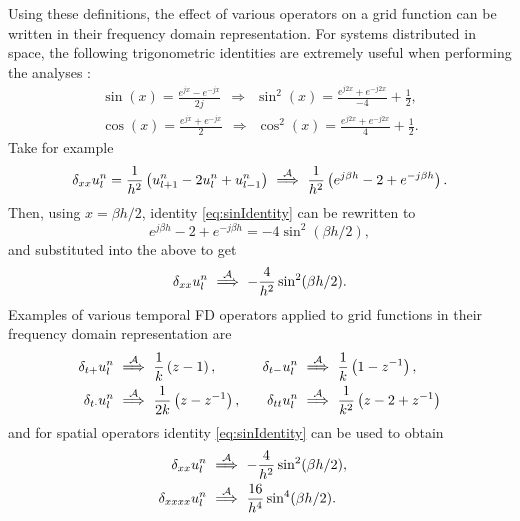 {{%
Using these definitions, the effect of various operators on a grid function can be written in their frequency domain representation. For systems distributed in space, the following trigonometric identities are extremely useful when performing the analyses \cite[p. 71]{Abramowitz1972}:
\begin{subequations}\label{eq:trigIdentities}
    \begin{gather}
        \sin(x) = \frac{e^{jx} - e^{-jx}}{2j}\ \ \Rightarrow \ \ \sin^2(x) %
        = \frac{e^{j2x} + e^{-j2x}}{-4} + \frac{1}{2},\label{eq:sinIdentity}\\
        \cos(x) = \frac{e^{jx} + e^{-jx}}{2}\ \ \Rightarrow \ \ \cos^2(x) %
        = \frac{e^{j2x} + e^{-j2x}}{4} + \frac{1}{2}.\label{eq:cosIdentity}
    \end{gather}
\end{subequations}
Take for example
\begin{equation*}
    \delta_{xx} u_l^n = \frac{1}{h^2}\left(u_{l+1}^n - 2 u_l^n + u_{l-1}^n\right)\ \overset{\mathcal{A}}{\Longrightarrow}\  \frac{1}{h^2}\left(e^{j\beta h} - 2 + e^{-j\beta h}\right).
\end{equation*}
Then, using $x = \beta h / 2$, identity \eqref{eq:sinIdentity} can be rewritten to 
\begin{equation*}
    e^{j\beta h} - 2 + e^{-j\beta h} = -4 \sin^2(\beta h / 2),
\end{equation*}
and substituted into the above to get
\begin{equation*}
    \delta_{xx} u_l^n \ \overset{\mathcal{A}}{\Longrightarrow}\  -\frac{4}{h^2}\sin^2(\beta h /2).
\end{equation*}
Examples of various temporal FD operators applied to grid functions in their frequency domain representation are
\begin{equation}\label{eq:temporalAnsatz}
    \begin{aligned}
    \delta_{t+} u_l^n &\ \overset{\mathcal{A}}{\Longrightarrow}\  \frac{1}{k} \left(z - 1\right),& \delta_{t-} u_l^n &\ \overset{\mathcal{A}}{\Longrightarrow}\  \frac{1}{k} \left(1 - z^{-1}\right),\\
    \delta_{t\cdot} u_l^n&\ \overset{\mathcal{A}}{\Longrightarrow}\  \dfrac{1}{2k} \left(z - z^{-1}\right), &\quad \delta_{tt} u_l^n&\ \overset{\mathcal{A}}{\Longrightarrow}\ \frac{1}{k^2} \left(z - 2 + z^{-1}\right)
    \end{aligned}
\end{equation}
and for spatial operators identity \eqref{eq:sinIdentity} can be used to obtain
\begin{subequations}
\begin{align}
    \delta_{xx}u_l^n&\ \overset{\mathcal{A}}{\Longrightarrow}\  -\frac{4}{h^2} \sin^2(\beta h / 2), \quad \label{eq:dxxAnsatz}\\
    \delta_{xxxx} u_l^n&\ \overset{\mathcal{A}}{\Longrightarrow}\ \frac{16}{h^4} \sin^4(\beta h / 2).\label{eq:dxxxxAnsatz}
\end{align}
\end{subequations}

}}
